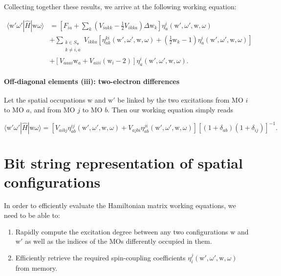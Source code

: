 \documentclass[12pt,a4paper]{report}
\begin{document}
Collecting together these results, we arrive at the following working
equation:

\begin{equation}\label{eq:hij_single_working}
  \begin{aligned}
   \langle \text{w}' \omega' | \hat{H} | \text{w} \omega \rangle &=
   \left[ F_{ia} + \sum_{k} \left( V_{iakk} - \frac{1}{2} V_{ikka}
     \right) \Delta \text{w}_{k} \right]
   \eta_{a}^{i}(\text{w}',\omega',\text{w},\omega) \\
   &+ \sum_{\substack{k \in S_{\text{w}} \\ k \ne i,a}} V_{ikka}
   \left[ \eta_{ak}^{ki}(\text{w}',\omega',\text{w},\omega) + \left(
     \frac{1}{2}\text{w}_{k} -1 \right)
     \eta_{a}^{i}(\text{w}',\omega',\text{w},\omega) \right] \\
   &+ \left[ V_{aaai} \text{w}_{a} + V_{aiii} \left( \text{w}_{i} -2
     \right) \right] \eta_{a}^{i}(\text{w}',\omega',\text{w},\omega).
  \end{aligned}
\end{equation}

\subsubsection{Off-diagonal elements (iii): two-electron differences}
Let the spatial occupations $\text{w}$ and $\text{w}'$ be linked by
the two excitations from MO $i$ to MO $a$, and from MO $j$ to MO
$b$. Then our working equation simply reads

\begin{equation}\label{eq:hij_double_working}
  \langle \text{w}' \omega' | \hat{H} | \text{w} \omega \rangle =
  \left[ V_{aibj} \eta_{ab}^{ij}(\text{w}',\omega',\text{w},\omega) +
    V_{ajbi} \eta_{ab}^{ji}(\text{w}',\omega',\text{w},\omega) \right]
  \left[ (1+\delta_{ab}) (1+\delta_{ij}) \right]^{-1}.
\end{equation}

\chapter{Bit string representation of spatial configurations}
In order to efficiently evaluate the Hamiltonian matrix working
equations, we need to be able to:

\begin{enumerate}
\item Rapidly compute the excitation degree between any two
  configurations $\text{w}$ and $\text{w}'$ as well as the indices of
  the MOs differently occupied in them.
\item Efficiently retrieve the required spin-coupling coefficients
  $\eta_{i}^{j}(\text{w}',\omega',\text{w},\omega)$ from memory.
\end{enumerate}
\end{document}
